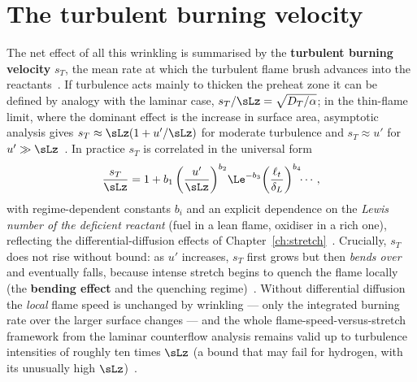 \section{The turbulent burning velocity}

The net effect of all this wrinkling is summarised by the \textbf{turbulent burning velocity} $s_T$, the mean rate at which the turbulent flame brush advances into the reactants~\cite{lecture9}. If turbulence acts mainly to thicken the preheat zone it can be defined by analogy with the laminar case, $s_T/\sLz=\sqrt{D_T/\alpha}$; in the thin-flame limit, where the dominant effect is the increase in surface area, asymptotic analysis gives $s_T\approx\sLz(1+u'/\sLz)$ for moderate turbulence and $s_T\approx u'$ for $u'\gg\sLz$~\cite{lecture9}. In practice $s_T$ is correlated in the universal form
\begin{equation}
\frac{s_T}{\sLz}=1+b_1\left(\frac{u'}{\sLz}\right)^{b_2}\!\Le^{-b_3}\!\left(\frac{\ell_t}{\delta_L}\right)^{b_4}\!\!\cdots,
\label{eq:sT-correlation}
\end{equation}
with regime-dependent constants $b_i$ and an explicit dependence on the \emph{Lewis number of the deficient reactant} (fuel in a lean flame, oxidiser in a rich one), reflecting the differential-diffusion effects of Chapter~\ref{ch:stretch}~\cite{lecture9,ciccarelli2008flame}. Crucially, $s_T$ does not rise without bound: as $u'$ increases, $s_T$ first grows but then \emph{bends over} and eventually falls, because intense stretch begins to quench the flame locally (the \textbf{bending effect} and the quenching regime)~\cite{lecture9}. Without differential diffusion the \emph{local} flame speed is unchanged by wrinkling --- only the integrated burning rate over the larger surface changes --- and the whole flame-speed-versus-stretch framework from the laminar counterflow analysis remains valid up to turbulence intensities of roughly ten times $\sLz$ (a bound that may fail for hydrogen, with its unusually high $\sLz$)~\cite{transcript_l9}.
